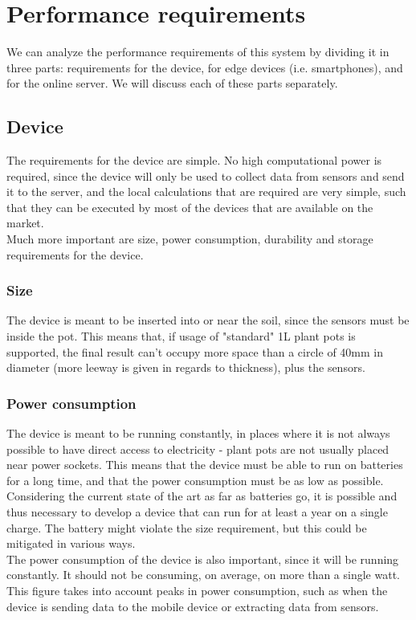 \section{Performance requirements}
We can analyze the performance requirements of this system by dividing it in three
parts: requirements for the device, for edge devices (i.e. smartphones), and for
the online server. We will discuss each of these parts separately.

\subsection{Device}
The requirements for the device are simple. No high computational power is required,
since the device will only be used to collect data from sensors and send it to the
server, and the local calculations that are required are very simple, such that
they can be executed by most of the devices that are available on the market. \\
Much more important are size, power consumption, durability and storage requirements
for the device.

\subsubsection{Size}
The device is meant to be inserted into or near the soil, since
the sensors must be inside the pot. This means that, if usage of "standard" 1L plant
pots is supported, the final result can't occupy more space than a circle of 40mm
in diameter (more leeway is given in regards to thickness), plus the sensors.

\subsubsection{Power consumption}
The device is meant to be running constantly, in places where it is not always possible
to have direct access to electricity - plant pots are not usually placed near power
sockets. This means that the device must be able to run on batteries for a long time,
and that the power consumption must be as low as possible. \\
Considering the current state of the art as far as batteries go, it is possible
and thus necessary to develop a device that can run for at least a year on a single
charge. The battery might violate the size requirement, but this could be mitigated
in various ways. \\
The power consumption of the device is also important, since it will be running
constantly. It should not be consuming, on average, on more than a single watt.
This figure takes into account peaks in power consumption, such as when the device
is sending data to the mobile device or extracting data from sensors.

